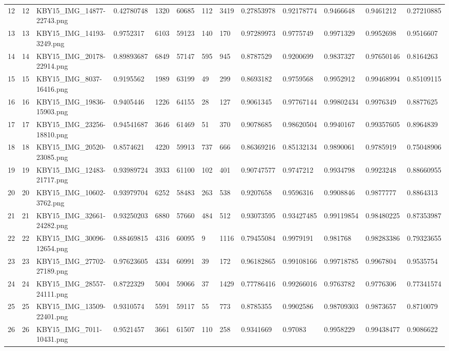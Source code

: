 \documentclass[11pt, a4paper, twoside]{report}
\begin{document}
\begin{longtable}[c]{@{}lllllllllllll@{}}
12 & 12 & KBY15\_IMG\_14877-22743.png & 0.42780748 & 1320 & 60685 & 112 & 3419 & 0.27853978 & 0.92178774 & 0.9466648 & 0.9461212 & 0.27210885 \\
13 & 13 & KBY15\_IMG\_14193-3249.png & 0.9752317 & 6103 & 59123 & 140 & 170 & 0.97289973 & 0.9775749 & 0.9971329 & 0.9952698 & 0.9516607 \\
14 & 14 & KBY15\_IMG\_20178-22914.png & 0.89893687 & 6849 & 57147 & 595 & 945 & 0.8787529 & 0.9200699 & 0.9837327 & 0.97650146 & 0.8164263 \\
15 & 15 & KBY15\_IMG\_8037-16416.png & 0.9195562 & 1989 & 63199 & 49 & 299 & 0.8693182 & 0.9759568 & 0.9952912 & 0.99468994 & 0.85109115 \\
16 & 16 & KBY15\_IMG\_19836-15903.png & 0.9405446 & 1226 & 64155 & 28 & 127 & 0.9061345 & 0.97767144 & 0.99802434 & 0.9976349 & 0.8877625 \\
17 & 17 & KBY15\_IMG\_23256-18810.png & 0.94541687 & 3646 & 61469 & 51 & 370 & 0.9078685 & 0.98620504 & 0.9940167 & 0.99357605 & 0.8964839 \\
18 & 18 & KBY15\_IMG\_20520-23085.png & 0.8574621 & 4220 & 59913 & 737 & 666 & 0.86369216 & 0.85132134 & 0.9890061 & 0.9785919 & 0.75048906 \\
19 & 19 & KBY15\_IMG\_12483-21717.png & 0.93989724 & 3933 & 61100 & 102 & 401 & 0.90747577 & 0.9747212 & 0.9934798 & 0.9923248 & 0.88660955 \\
20 & 20 & KBY15\_IMG\_10602-3762.png & 0.93979704 & 6252 & 58483 & 263 & 538 & 0.9207658 & 0.9596316 & 0.9908846 & 0.9877777 & 0.8864313 \\
21 & 21 & KBY15\_IMG\_32661-24282.png & 0.93250203 & 6880 & 57660 & 484 & 512 & 0.93073595 & 0.93427485 & 0.99119854 & 0.98480225 & 0.87353987 \\
22 & 22 & KBY15\_IMG\_30096-12654.png & 0.88469815 & 4316 & 60095 & 9 & 1116 & 0.79455084 & 0.9979191 & 0.981768 & 0.98283386 & 0.79323655 \\
23 & 23 & KBY15\_IMG\_27702-27189.png & 0.97623605 & 4334 & 60991 & 39 & 172 & 0.96182865 & 0.99108166 & 0.99718785 & 0.9967804 & 0.9535754 \\
24 & 24 & KBY15\_IMG\_28557-24111.png & 0.8722329 & 5004 & 59066 & 37 & 1429 & 0.77786416 & 0.99266016 & 0.9763782 & 0.9776306 & 0.77341574 \\
25 & 25 & KBY15\_IMG\_13509-22401.png & 0.9310574 & 5591 & 59117 & 55 & 773 & 0.8785355 & 0.9902586 & 0.98709303 & 0.9873657 & 0.8710079 \\
26 & 26 & KBY15\_IMG\_7011-10431.png & 0.9521457 & 3661 & 61507 & 110 & 258 & 0.9341669 & 0.97083 & 0.9958229 & 0.99438477 & 0.9086622 \\

\end{longtable}
\end{document}
